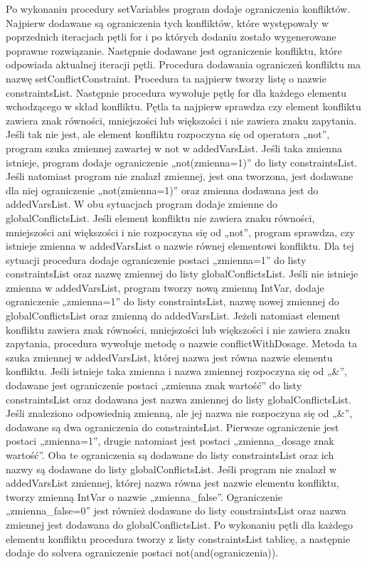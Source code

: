 Po wykonaniu procedury setVariables program dodaje ograniczenia konfliktów. Najpierw dodawane są ograniczenia tych konfliktów, które występowały w poprzednich iteracjach pętli for i po których dodaniu zostało wygenerowane poprawne rozwiązanie. Następnie dodawane jest ograniczenie konfliktu, które odpowiada aktualnej iteracji pętli. Procedura dodawania ograniczeń konfliktu ma nazwę setConflictConstraint. Procedura ta najpierw tworzy listę o nazwie constraintsList. Następnie procedura wywołuje pętlę for dla każdego elementu wchodzącego w skład konfliktu. Pętla ta najpierw sprawdza czy element konfliktu zawiera znak równości, mniejszości lub większości i nie zawiera znaku zapytania. Jeśli tak nie jest, ale element konfliktu rozpoczyna się od operatora „not”, program szuka zmiennej zawartej w not w addedVarsList. Jeśli taka zmienna istnieje, program dodaje ograniczenie „not(zmienna=1)” do listy constraintsList. Jeśli natomiast program nie znalazł zmiennej, jest ona tworzona, jest dodawane dla niej ograniczenie „not(zmienna=1)” oraz zmienna dodawana jest do addedVarsList. W obu sytuacjach program dodaje zmienne do globalConflictsList. Jeśli element konfliktu nie zawiera znaku równości, mniejszości ani większości i nie rozpoczyna się od „not”, program sprawdza, czy istnieje zmienna w addedVarsList o nazwie równej elementowi konfliktu. Dla tej sytuacji procedura dodaje ograniczenie postaci „zmienna=1” do listy constraintsList oraz nazwę zmiennej do listy globalConflictsList. Jeśli nie istnieje zmienna w addedVarsList, program tworzy nową zmienną IntVar, dodaje ograniczenie „zmienna=1” do listy constraintsList, nazwę nowej zmiennej do globalConflictsList oraz zmienną do addedVarsList. Jeżeli natomiast element konfliktu zawiera znak równości, mniejszości lub większości i nie zawiera znaku zapytania, procedura wywołuje metodę o nazwie conflictWithDosage. Metoda ta szuka zmiennej w addedVarsList, której nazwa jest równa nazwie elementu konfliktu. Jeśli istnieje taka zmienna i nazwa zmiennej rozpoczyna się od „\&”, dodawane jest ograniczenie postaci „zmienna znak wartość” do listy constraintsList oraz dodawana jest nazwa zmiennej do listy globalConflictsList. Jeśli znaleziono odpowiednią zmienną, ale jej nazwa nie rozpoczyna się od „\&”, dodawane są dwa ograniczenia do constraintsList. Pierwsze ograniczenie jest postaci „zmienna=1”, drugie natomiast jest postaci „zmienna\_dosage znak wartość”. Oba te ograniczenia są dodawane do listy constraintsList oraz ich nazwy są dodawane do listy globalConflictsList. Jeśli program nie znalazł w addedVarsList zmiennej, której nazwa równa jest nazwie elementu konfliktu,  tworzy zmienną IntVar o nazwie „zmienna\_false”. Ograniczenie „zmienna\_false=0” jest również dodawane do listy constraintsList oraz nazwa zmiennej jest dodawana do globalConflictsList. Po wykonaniu pętli dla każdego elementu konfliktu procedura tworzy z listy constraintsList tablicę, a następnie dodaje do solvera ograniczenie postaci not(and(ograniczenia)). 

